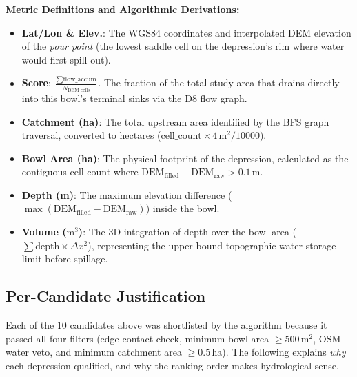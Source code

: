 \documentclass[12pt,a4paper]{article}
\begin{document}
\textbf{Metric Definitions and Algorithmic Derivations:}
\begin{itemize}
    \item \textbf{Lat/Lon \& Elev.}: The WGS84 coordinates and interpolated DEM elevation of the \emph{pour point} (the lowest saddle cell on the depression's rim where water would first spill out).
    \item \textbf{Score}: $\frac{\sum \text{flow\_accum}}{N_{\text{DEM cells}}}$. The fraction of the total study area that drains directly into this bowl's terminal sinks via the D8 flow graph.
    \item \textbf{Catchment (ha)}: The total upstream area identified by the BFS graph traversal, converted to hectares ($\text{cell\_count} \times 4\,\text{m}^2 / 10000$).
    \item \textbf{Bowl Area (ha)}: The physical footprint of the depression, calculated as the contiguous cell count where $\text{DEM}_{\text{filled}} - \text{DEM}_{\text{raw}} > 0.1\,\text{m}$.
    \item \textbf{Depth (m)}: The maximum elevation difference ($\max(\text{DEM}_{\text{filled}} - \text{DEM}_{\text{raw}})$) inside the bowl.
    \item \textbf{Volume ($\text{m}^3$)}: The 3D integration of depth over the bowl area ($\sum \text{depth} \times \Delta x^2$), representing the upper-bound topographic water storage limit before spillage.
\end{itemize}

\subsection{Per-Candidate Justification}

Each of the 10 candidates above was shortlisted by the algorithm because it passed all
four filters (edge-contact check, minimum bowl area $\geq 500\,\text{m}^2$, OSM water
veto, and minimum catchment area $\geq 0.5\,\text{ha}$). The following explains
\emph{why} each depression qualified, and why the ranking order makes hydrological sense.
\end{document}
